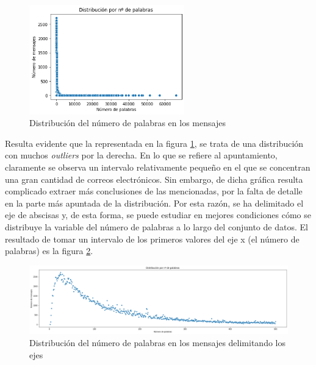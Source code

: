 \begin{figure}[h]
	\centering%
	\centerline{\includegraphics[width = 0.6\textwidth]{Imagenes/Bitmap/dist-palabras.png}}%
	\caption{Distribución del número de palabras en los mensajes}%
	\label{fig:distpal}
\end{figure}

Resulta evidente que la representada en la figura \ref{fig:distpal}, se trata de una distribución con muchos \textit{outliers} por la derecha. En lo que se refiere al apuntamiento, claramente se observa un intervalo relativamente pequeño en el que se concentran una gran cantidad de correos electrónicos. Sin embargo, de dicha gráfica resulta complicado extraer más conclusiones de las mencionadas, por la falta de detalle en la parte más apuntada de la distribución. Por esta razón, se ha delimitado el eje de abscisas y, de esta forma, se puede estudiar en mejores condiciones cómo se distribuye la variable del número de palabras a lo largo del conjunto de datos. El resultado de tomar un intervalo de los primeros valores del eje x (el número de palabras) es la figura \ref{fig:distminpal}.

\begin{figure}[h]
	\centering%
	\centerline{\includegraphics[width = 1.3\textwidth]{Imagenes/Bitmap/dist-mini-palabras.png}}%
	\caption{Distribución del número de palabras en los mensajes delimitando los ejes}%
	\label{fig:distminpal}
\end{figure}


